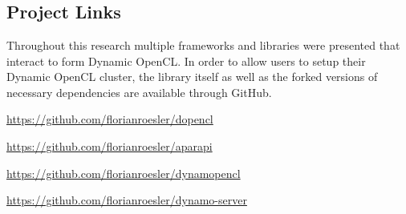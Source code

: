 \chapter{\appendixname}

\section{Project Links}

Throughout this research multiple frameworks and libraries were presented that interact to form Dynamic OpenCL. In order to allow users to setup their Dynamic OpenCL cluster, the library itself as well as the forked versions of necessary dependencies are available through GitHub.

\begin{description}[align=left]
	\item [dOpenCL] \url{https://github.com/florianroesler/dopencl}
	\item [Aparapi] \url{https://github.com/florianroesler/aparapi}
	\item [Dynamic OpenCL] \url{https://github.com/florianroesler/dynamopencl}
	\item [Dynamic OpenCL Server] \url{https://github.com/florianroesler/dynamo-server}
\end{description}

